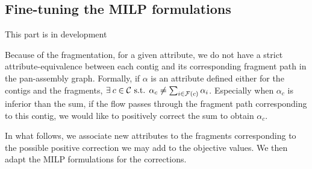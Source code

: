 \subsection{Fine-tuning the MILP formulations}

\begin{warningbox}
    This part is in development
\end{warningbox}

Because of the fragmentation, for a given attribute, we do not have a strict attribute-equivalence between each contig and its corresponding fragment path in the pan-assembly graph.
Formally, if \(\alpha\) is an attribute defined either for the contigs and the fragments, 
\(\exists c \in \Contigs{} \text{ s.t. } \alpha_c \neq \sum_{i \in \Fragments{}(c)} \alpha_i\).
Especially when \(\alpha_c\) is inferior than the sum, if the flow passes through the fragment path corresponding to this contig, we would like to positively correct the sum to obtain \(\alpha_c\).

In what follows, we associate new attributes to the fragments corresponding to the possible positive correction we may add to the objective values.
We then adapt the MILP formulations for the corrections.


% 